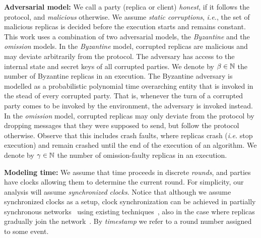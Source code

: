 \textbf{Adversarial model:}
We call a party (replica or client) \emph{honest}, if it follows the protocol, and \emph{malicious} otherwise.
We assume \emph{static corruptions},  \textit{i.e.}, the set of malicious replicas is decided before the execution starts and remains constant.
This work uses a combination of two adversarial models, the \emph{Byzantine} and the \emph{omission} models.
In the \emph{Byzantine} model, corrupted replicas are malicious and may deviate arbitrarily from the protocol. The adversary has access to the internal state and secret keys of all corrupted parties. We denote by $\beta \in \BN$ the  number of Byzantine replicas in an execution.
The Byzantine adversary is modelled as a probabilistic polynomial time overarching entity that is invoked in the stead of every corrupted party.
That is, whenever the turn of a corrupted party comes to be invoked by the environment, the adversary is invoked instead.
In the \emph{omission} model, corrupted replicas may only deviate from the protocol by dropping messages that they were supposed to send, but follow the protocol otherwise. Observe that this includes crash faults, where replicas crash (\textit{i.e.} stop execution) and remain crashed until the end of the execution of an algorithm. We denote by $\gamma \in \BN$ the number of omission-faulty replicas in an execution.



\textbf{Modeling time:}
We assume that time proceeds in discrete \emph{rounds}, and parties have clocks allowing them to determine the current round.
For simplicity, our analysis will assume \emph{synchronized clocks}.
Notice that although we assume synchronized clocks as a setup, clock synchronization can be achieved in partially synchronous networks~\cite{psync} using existing techniques~\cite{clockoverview}, also in the case where replicas gradually join the network~\cite{bootclocksync}.
By \emph{timestamp} we refer to a round number assigned to some event.

